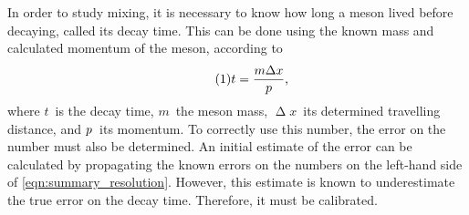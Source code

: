 In order to study mixing, it is necessary to know how long a meson lived before decaying, called its decay time.
This can be done using the known mass and calculated momentum of the meson, according to
%
\begin{equation} \tag{1} \label{eqn:summary_resolution}
    t = \dfrac{m \upDelta x}{\ptot} \rlap{,}
\end{equation}
%
where \(t\)~is the decay time, \(m\)~the meson mass, \(\upDelta x\)~its determined travelling distance, and \(\mbox{\ensuremath{p}}\)~its momentum.
To correctly use this number, the error on the number must also be determined.
An initial estimate of the error can be calculated by propagating the known errors on the numbers on the left-hand side of \cref{eqn:summary_resolution}.
However, this estimate is known to underestimate the true error on the decay time.
Therefore, it must be calibrated.
%
